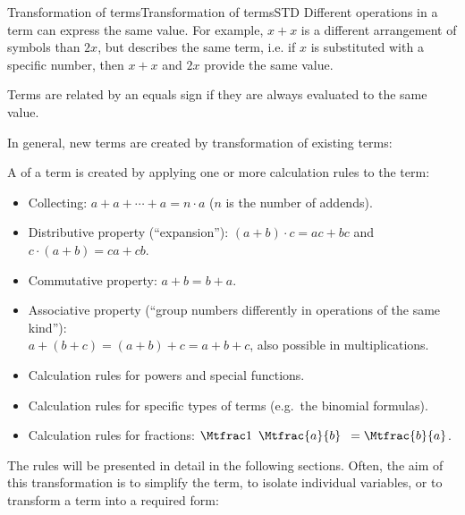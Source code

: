 \begin{MXContent}{Transformation of terms}{Transformation of terms}{STD}
Different operations in a term can express the same value. For example, $x+x$ is a different 
arrangement of symbols than $2x$, but describes the same term, i.e. if $x$ is substituted with a specific number, then 
$x+x$ and $2x$ provide the same value.

\begin{MInfo}
Terms are related by an equals sign if they are always evaluated to the same value.
\end{MInfo}

In general, new terms are created by transformation of existing terms:

\begin{MInfo}
A  of a term is created by applying one or more calculation 
rules to the term:

\begin{itemize}
\item{Collecting: $a+a+\cdots+a=n\cdot a$ ($n$ is the number of addends).}
\item{Distributive property  (``expansion''): $(a+b)\cdot c = a c+b c$ and $c\cdot(a+b)=c a+c b$.}
\item{Commutative property: $a+b=b+a$.}
\item{Associative property (``group numbers differently in operations of the same kind''): \\$a+(b+c)=(a+b)+c=a+b+c$, 
also possible in multiplications.}
\item{Calculation rules for powers and special functions.}
\item{Calculation rules for specific types of terms (e.g.\ the binomial formulas).}
\item{Calculation rules for fractions: $\Mtfrac1{\phantom{2}\Mtfrac{a}{b}\phantom{2}}=\Mtfrac{b}{a}$.}
\end{itemize}
\end{MInfo}

The rules will be presented in detail in the following sections. Often, the aim of this transformation is to 
simplify the term, to isolate individual variables, or to transform a term into a required form:



\end{MXContent}
